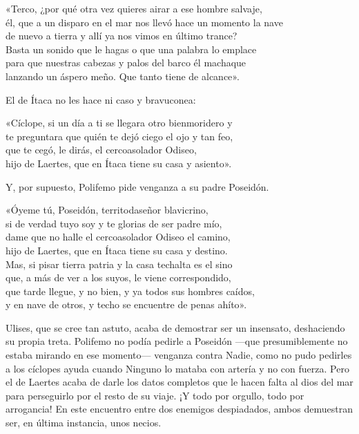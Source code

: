 \begin{versocita}
«Terco, ¿por qué otra vez quieres airar a ese hombre salvaje,\\
él, que a un disparo en el mar nos llevó hace un momento la nave\\
de nuevo a tierra y allí ya nos vimos en último trance?\\
Basta un sonido que le hagas o que una palabra lo emplace\\
para que nuestras cabezas y palos del barco él machaque\\
lanzando un áspero meño. Que tanto tiene de alcance».
\end{versocita}

El de Ítaca no les hace ni caso y bravuconea:

\begin{versocita}
«Cíclope, si un día a ti se llegara otro bienmoridero y\\
te preguntara que quién te dejó ciego el ojo y tan feo,\\
que te cegó, le dirás, el cercoasolador Odiseo,\\
hijo de Laertes, que en Ítaca tiene su casa y asiento».
\end{versocita}

Y, por supuesto, Polifemo pide venganza a su padre Poseidón.

\begin{versocita}
«Óyeme tú, Poseidón, territodaseñor blavicrino,\\
si de verdad tuyo soy y te glorias de ser padre mío,\\
dame que no halle el cercoasolador Odiseo el camino,\\
hijo de Laertes, que en Ítaca tiene su casa y destino.\\
Mas, si pisar tierra patria y la casa techalta es el sino\\
que, a más de ver a los suyos, le viene correspondido,\\
que tarde llegue, y no bien, y ya todos sus hombres caídos,\\
y en nave de otros, y techo se encuentre de penas ahíto».
\end{versocita}

Ulises, que se cree tan astuto, acaba de demostrar ser un insensato, deshaciendo su propia treta. Polifemo no podía pedirle a Poseidón ---que presumiblemente no estaba mirando en ese momento--- venganza contra Nadie, como no pudo pedirles a los cíclopes ayuda cuando Ninguno lo mataba con artería y no con fuerza. Pero el de Laertes acaba de darle los datos completos que le hacen falta al dios del mar para perseguirlo por el resto de su viaje. ¡Y todo por orgullo, todo por arrogancia! En este encuentro entre dos enemigos despiadados, ambos demuestran ser, en última instancia, unos necios.


